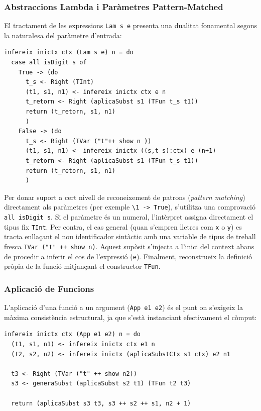 \subsubsection{Abstraccions Lambda i Paràmetres Pattern-Matched}

El tractament de les expressions \texttt{Lam s e} presenta una dualitat fonamental segons la naturalesa del paràmetre d'entrada:

\begin{lstlisting}[style=haskellstyle, caption=Inferència de tipus per a abstraccions lambda i literals en línia]
infereix inictx ctx (Lam s e) n = do
  case all isDigit s of
    True -> (do  
      t_s <- Right (TInt)                                     
      (t1, s1, n1) <- infereix inictx ctx e n                 
      t_retorn <- Right (aplicaSubst s1 (TFun t_s t1))        
      return (t_retorn, s1, n1)
      )
    False -> (do  
      t_s <- Right (TVar ("t"++ show n ))                     
      (t1, s1, n1) <- infereix inictx ((s,t_s):ctx) e (n+1)   
      t_retorn <- Right (aplicaSubst s1 (TFun t_s t1))        
      return (t_retorn, s1, n1)
      )
\end{lstlisting}

Per donar suport a cert nivell de reconeixement de patrons (\textit{pattern matching}) directament als paràmetres (per exemple \texttt{\textbackslash 1 -> True}), s'utilitza una comprovació \texttt{all isDigit s}. Si el paràmetre és un numeral, l'intèrpret assigna directament el tipus fix \texttt{TInt}. Per contra, el cas general (quan s'empren lletres com \texttt{x} o \texttt{y}) es tracta enllaçant el nou identificador sintàctic amb una variable de tipus de treball fresca \texttt{TVar ("t" ++ show n)}. Aquest supòsit s'injecta a l'inici del context abans de procedir a inferir el cos de l'expressió (\texttt{e}). Finalment, reconstrueix la definició pròpia de la funció mitjançant el constructor \texttt{TFun}.

\subsubsection{Aplicació de Funcions}

L'aplicació d'una funció a un argument (\texttt{App e1 e2}) és el punt on s'exigeix la màxima consistència estructural, ja que s'està instanciant efectivament el còmput:

\begin{lstlisting}[style=haskellstyle, caption=Inferència i unificació acumulativa de l'aplicació de funcions]
infereix inictx ctx (App e1 e2) n = do
  (t1, s1, n1) <- infereix inictx ctx e1 n                       
  (t2, s2, n2) <- infereix inictx (aplicaSubstCtx s1 ctx) e2 n1  
  
  t3 <- Right (TVar ("t" ++ show n2))                     
  s3 <- generaSubst (aplicaSubst s2 t1) (TFun t2 t3)      
  
  return (aplicaSubst s3 t3, s3 ++ s2 ++ s1, n2 + 1)
\end{lstlisting}

